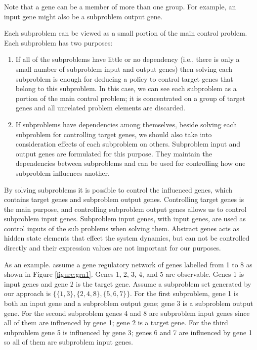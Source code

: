 Note that a gene can be a member of more than one group. For example, an input gene might also be a subproblem output gene.

Each subproblem can be viewed as a small portion of the main control problem. Each subproblem has two
purposes:
\begin{enumerate}
  \item If all of the subproblems have little or no dependency (i.e., there is only a small number of subproblem
  input and output genes) then solving each subproblem is enough for deducing a policy to control target genes that
  belong to this subproblem. In this case, we can see each subproblem as a portion of the main control
  problem; it is concentrated on a group of target genes and all unrelated problem elements are discarded.
  \item If subproblems have dependencies among themselves, beside solving each subproblem for controlling target
  genes, we should also take into consideration effects of each subproblem on others. Subproblem input and output
  genes are formulated for this purpose. They maintain the dependencies between subproblems and can be used for
  controlling how one subproblem influences another.
\end{enumerate}

By solving subproblems it is possible to control the influenced genes, which contains target genes and subproblem output genes. Controlling target genes is the main purpose, and controlling subproblem output genes allows us to control subproblem input genes. Subproblem input genes, with input genes, are used as control inputs of the sub problems when solving them. Abstract genes acts as hidden state elements that effect the system dynamics, but can not be controlled directly and their expression values are not important for our purposes.

As an example. assume a gene regulatory network of genes labelled from 1 to 8 as shown in Figure \ref{figure:grn1}. Genes 1, 2, 3, 4, and 5 are observable. Genes 1 is input genes and gene 2 is the target gene. Assume a subproblem set generated by our approach is $\{\{1,3\},\{2,4,8\},\{5,6,7\}\}$. For the first subproblem, gene 1 is both an input gene and a subproblem output gene; gene 3 is a subproblem output gene. For the second subproblem genes 4 and 8 are subproblem input genes since all of them are influenced by gene 1;  gene 2 is a target gene. For the third subproblem gene 5 is influenced by gene 3; genes 6 and  7 are influenced by gene 1 so all of them are subproblem input genes.

